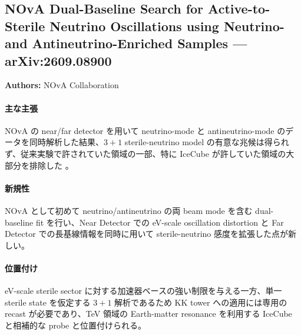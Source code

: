 \subsection{NOvA Dual-Baseline Search for Active-to-Sterile Neutrino Oscillations using Neutrino- and Antineutrino-Enriched Samples --- arXiv:2609.08900}

\textbf{Authors:} NOvA Collaboration

\paragraph{主な主張}
NOvA の near/far detector を用いて neutrino-mode と antineutrino-mode のデータを同時解析した結果、$3+1$ sterile-neutrino model の有意な兆候は得られず、従来実験で許されていた領域の一部、特に IceCube が許していた領域の大部分を排除した \cite{NOvA:2026sterile}。

\paragraph{新規性}
NOvA として初めて neutrino/antineutrino の両 beam mode を含む dual-baseline fit を行い、Near Detector での eV-scale oscillation distortion と Far Detector での長基線情報を同時に用いて sterile-neutrino 感度を拡張した点が新しい。

\paragraph{位置付け}
eV-scale sterile sector に対する加速器ベースの強い制限を与える一方、単一 sterile state を仮定する $3+1$ 解析であるため KK tower への適用には専用の recast が必要であり、TeV 領域の Earth-matter resonance を利用する IceCube と相補的な probe と位置付けられる。
